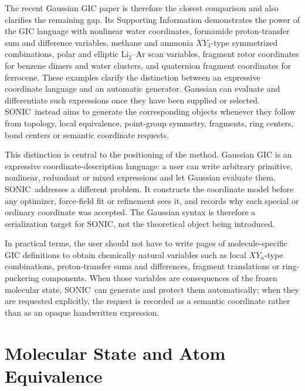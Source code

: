 \documentclass[journal=jctcce,manuscript=article,layout=traditional]{achemso}
\newcommand{\SONIC}{SONIC}
\theoremstyle{definition}
\begin{document}
The recent Gaussian GIC paper is therefore the closest comparison and also
clarifies the remaining gap.  Its Supporting Information demonstrates the
power of the GIC language with nonlinear water coordinates, formamide
proton-transfer sum and difference variables, methane and ammonia
\(XY_3\)-type symmetrized combinations, polar and elliptic Li\(_2\)--Ar scan
variables, fragment rotor coordinates for benzene dimers and water clusters,
and quaternion fragment coordinates for ferrocene.\cite{Marenich2025GIC}
These examples clarify the distinction between an expressive coordinate
language and an automatic generator.  Gaussian can evaluate and differentiate
such expressions once they have been supplied or selected.  \SONIC\ instead aims
to generate the corresponding objects whenever they follow from topology, local
equivalence, point-group symmetry, fragments, ring centers, bond centers or
semantic coordinate requests.

This distinction is central to the positioning of the method.  Gaussian GIC is
an expressive coordinate-description language: a user can write arbitrary
primitive, nonlinear, redundant or mixed expressions and let Gaussian evaluate
them.  \SONIC\ addresses a different problem.  It constructs the coordinate model
before any optimizer, force-field fit or refinement sees it, and records why
each special or ordinary coordinate was accepted.  The Gaussian syntax is
therefore a serialization target for \SONIC, not the theoretical object being
introduced.

In practical terms, the user should not have to write pages of molecule-specific
GIC definitions to obtain chemically natural variables such as local
\(XY_n\)-type combinations, proton-transfer sums and differences, fragment
translations or ring-puckering components.  When those variables are consequences
of the frozen molecular state, \SONIC\ can generate and protect them
automatically; when they are requested explicitly, the request is recorded as a
semantic coordinate rather than as an opaque handwritten expression.

\section{Molecular State and Atom Equivalence}
\end{document}
